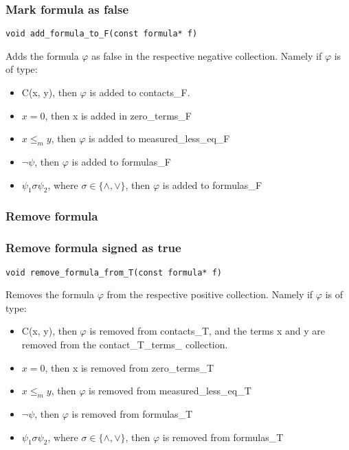 \documentclass{article}
\begin{document}
			\subsubsection*{Mark formula as false}
				\begin{lstlisting}
void add_formula_to_F(const formula* f)
				\end{lstlisting}
				Adds the formula $\varphi$ as false in the respective negative collection.
				Namely if $\varphi$ is of type:
				\begin{itemize}
					\item C(x, y), then $\varphi$ is added to contacts\_F.
					\item $x = 0$, then x is added in zero\_terms\_F
					\item $x \le_m y$, then $\varphi$ is added to measured\_less\_eq\_F
					\item $\neg \psi$, then $\varphi$ is added to formulas\_F
					\item $\psi_1 \sigma \psi_2$, where $\sigma \in \{\wedge, \vee\}$, then $\varphi$ is added to formulas\_F
				\end{itemize}
			\subsubsection*{Remove formula}
			\subsubsection*{Remove formula signed as true}
				\begin{lstlisting}
void remove_formula_from_T(const formula* f)
				\end{lstlisting}
				Removes the formula $\varphi$ from the respective positive collection.
				Namely if $\varphi$ is of type:
				\begin{itemize}
					\item C(x, y), then $\varphi$ is removed from contacts\_T, and the terms x and y are removed from the contact\_T\_terms\_ collection.
					\item $x = 0$, then x is removed from zero\_terms\_T
					\item $x \le_m y$, then $\varphi$ is removed from measured\_less\_eq\_T
					\item $\neg \psi$, then $\varphi$ is removed from formulas\_T
					\item $\psi_1 \sigma \psi_2$, where $\sigma \in \{\wedge, \vee\}$, then $\varphi$ is removed from formulas\_T
				\end{itemize}
\end{document}
